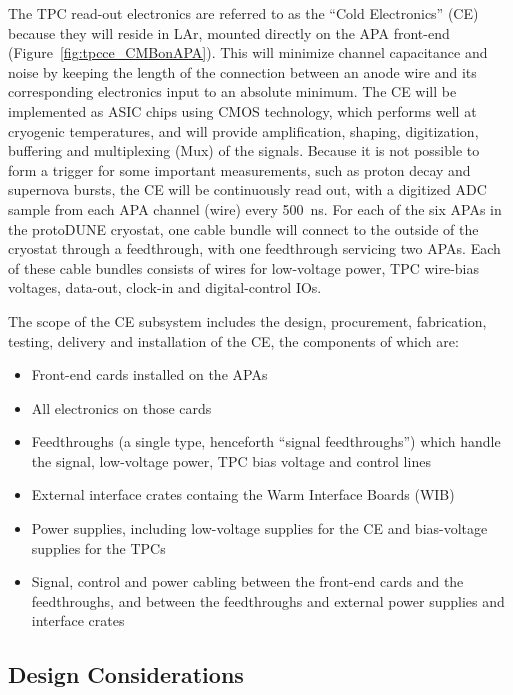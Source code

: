 The TPC read-out electronics are referred to as the ``Cold Electronics'' (CE) because they will reside in LAr,
mounted directly on the APA front-end (Figure~\ref{fig:tpcce_CMBonAPA}).
This will minimize channel capacitance and noise by keeping the length of the connection between an anode wire
and its corresponding electronics input to an absolute minimum.
The CE will be implemented as ASIC chips using CMOS technology,
which performs well at cryogenic temperatures,
and will provide amplification, shaping, digitization, buffering and multiplexing (Mux) of the signals.
Because it is not possible to form a trigger for some important measurements,
such as proton decay and supernova bursts, the CE will be continuously read out,
with a digitized ADC sample from each APA channel (wire) every 500~ns.
For each of the six APAs in the protoDUNE cryostat, one cable bundle will connect to the outside of the cryostat through
a feedthrough, with one feedthrough servicing two APAs.
Each of these cable bundles consists of wires for low-voltage power, TPC wire-bias voltages, data-out, clock-in and
digital-control IOs.

The scope of the CE subsystem includes the design, procurement, fabrication, testing,
delivery and installation of the CE, the components of which are:
\begin{itemize}
\item Front-end cards installed on the APAs
\item All electronics on those cards
\item Feedthroughs (a single type, henceforth ``signal feedthroughs'') which handle the signal,
low-voltage power, TPC bias voltage and control lines
\item External interface crates containg the Warm Interface Boards (WIB)
\item Power supplies, including low-voltage supplies for the CE and bias-voltage supplies for the TPCs
\item Signal, control and power cabling between the front-end cards and the feedthroughs,
and between the feedthroughs and external power supplies and interface crates
\end{itemize}

%
\subsection{Design Considerations} 
\label{subsec:ce_reqs_n_specs}

